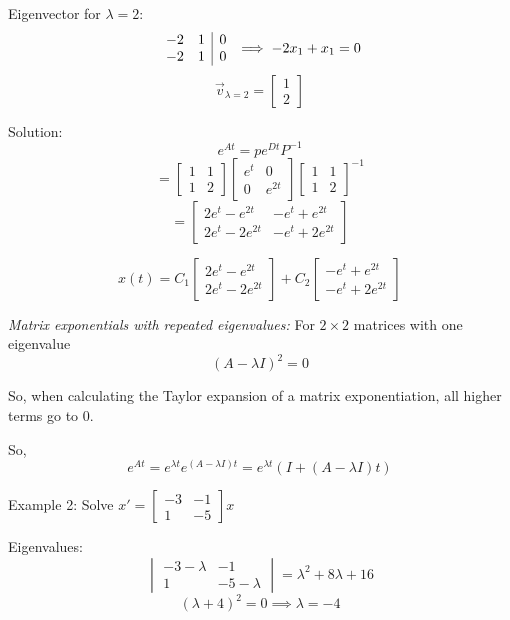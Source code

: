 \documentclass[12pt]{article}
\begin{document}
Eigenvector for $\lambda = 2$:
\[\begin{array}{c c |c}
    -2 & 1 & 0\\
    -2 & 1 & 0
\end{array} \implies -2x_1 + x_1 = 0\]
\[\vec{v}_{\lambda = 2} = \begin{bmatrix}
    1\\
    2
\end{bmatrix}\]

Solution:
\[e^{At} = pe^{Dt}P^{-1}\]
\[ = \begin{bmatrix}
    1 & 1\\
    1 & 2
\end{bmatrix} \begin{bmatrix}
    e^t & 0\\
    0 & e^{2t}
\end{bmatrix} \begin{bmatrix}
    1 & 1\\
    1 & 2
\end{bmatrix}^{-1}\]
\[= \begin{bmatrix}
    2e^t - e^{2t} & -e^t + e^{2t}\\
    2e^t - 2e^{2t} & -e^t + 2e^{2t}
\end{bmatrix}\]

\[\boxed{x(t) = C_1 \begin{bmatrix}
    2e^t - e^{2t}\\
    2e^t - 2e^{2t}
\end{bmatrix} + C_2 \begin{bmatrix}
    -e^t + e^{2t}\\
    -e^t + 2e^{2t}
\end{bmatrix}}\]

\emph{Matrix exponentials with repeated eigenvalues:}
For $2 \times 2$ matrices with one eigenvalue 
\[(A - \lambda I)^2 = 0\]

So, when calculating the Taylor expansion of a matrix exponentiation, all higher terms go to 0. 

So, 
\[e^{At} = e^{\lambda t}e^{(A - \lambda I) t} = e^{\lambda t} \left(I + (A - \lambda I)t\right)\]

Example 2: Solve $x' = \begin{bmatrix}
    -3 & -1\\
    1 & -5
\end{bmatrix}x$

Eigenvalues:
\[\begin{vmatrix}
    -3 - \lambda & -1\\
    1 & -5 - \lambda
\end{vmatrix} = \lambda^2 + 8\lambda + 16\]
\[(\lambda + 4)^2 = 0 \implies \lambda = -4\]
\end{document}
